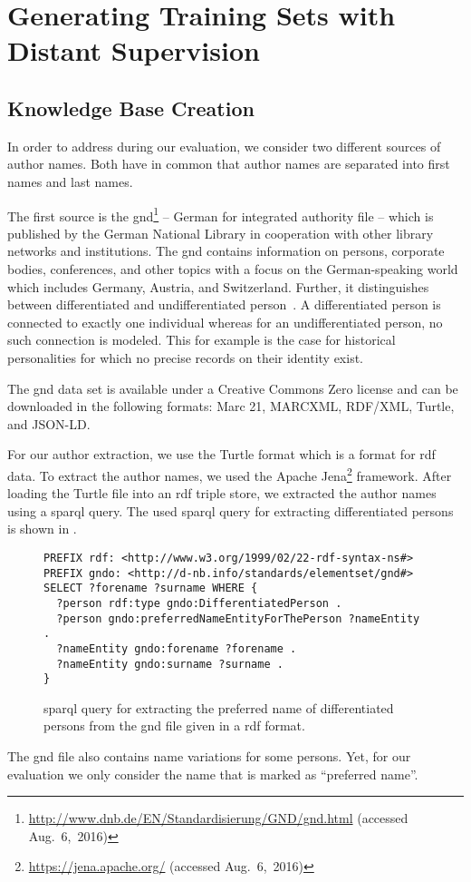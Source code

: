 \section{Generating Training Sets with Distant Supervision}\label{sec:i-distant-supervision}

\subsection{Knowledge Base Creation}\label{subsec:i-knowledge-base-creation}

In order to address  during our evaluation, we consider two different sources of author names.
Both have in common that author names are separated into first names and last names.

\bigskip

The first source is the \acrfull{gnd}\footnote{\url{http://www.dnb.de/EN/Standardisierung/GND/gnd.html} (accessed Aug.~6,~2016)} -- German for integrated authority file --  which is published by the German National Library in cooperation with other library networks and institutions.
The \gls{gnd} contains information on persons, corporate bodies, conferences, and other topics with a focus on the German-speaking world which includes Germany, Austria, and Switzerland.
Further, it distinguishes between differentiated and undifferentiated person~\citep{hochstein2013ihr}.
A differentiated person is connected to exactly one individual whereas for an undifferentiated person, no such connection is modeled.
This for example is the case for historical personalities for which no precise records on their identity exist.

The \gls{gnd} data set is available under a Creative Commons Zero license and can be downloaded in the following formats: Marc 21, MARCXML, RDF/XML, Turtle, and JSON-LD.\@

For our author extraction, we use the Turtle format which is a format for \gls{rdf} data.
To extract the author names, we used the Apache Jena\footnote{\url{https://jena.apache.org/} (accessed Aug.~6,~2016)} framework.
After loading the Turtle file into an \gls{rdf} triple store, we extracted the author names using a \gls{sparql} query.
The used \gls{sparql} query for extracting differentiated persons is shown in .
\begin{figure}[t]
\begin{lstlisting}[basicstyle=\ttfamily]
PREFIX rdf: <http://www.w3.org/1999/02/22-rdf-syntax-ns#>
PREFIX gndo: <http://d-nb.info/standards/elementset/gnd#>
SELECT ?forename ?surname WHERE {
  ?person rdf:type gndo:DifferentiatedPerson .
  ?person gndo:preferredNameEntityForThePerson ?nameEntity .
  ?nameEntity gndo:forename ?forename .
  ?nameEntity gndo:surname ?surname .
}
\end{lstlisting}
\caption{\gls{sparql} query for extracting the preferred name of differentiated persons from the \gls{gnd} file given in a \gls{rdf} format.}
\label{fig:gnd-sparql-query}
\end{figure}
The \gls{gnd} file also contains name variations for some persons.
Yet, for our evaluation we only consider the name that is marked as ``preferred name''.

